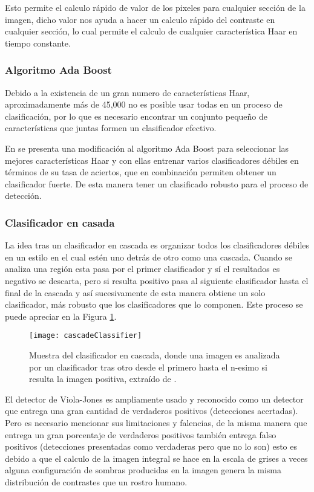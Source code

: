 Esto permite el calculo rápido de valor de los pixeles para cualquier sección de la imagen, dicho valor nos ayuda a hacer un calculo rápido del contraste en cualquier sección, lo cual permite el calculo de cualquier característica Haar en tiempo constante.
\subsubsection{Algoritmo Ada Boost}
Debido a la existencia de un gran numero de características Haar, aproximadamente más de 45,000 no es posible usar todas en un proceso de clasificación, por lo que es necesario encontrar un conjunto pequeño de características que juntas formen un clasificador efectivo.

En \cite{viola2001rapid} se presenta una modificación al algoritmo Ada Boost para seleccionar las mejores características Haar y con ellas entrenar varios clasificadores débiles en términos de su tasa de aciertos, que en combinación permiten obtener un clasificador fuerte. De esta manera tener un clasificado robusto para el proceso de detección.
\subsubsection{Clasificador en casada}
La idea tras un clasificador en cascada es organizar todos los clasificadores débiles en un estilo en el cual estén uno detrás de otro como una cascada. Cuando se analiza una región esta pasa por el primer clasificador y sí el resultados es negativo se descarta, pero si resulta positivo pasa al siguiente clasificador hasta el final de la cascada y así sucesivamente de esta manera obtiene un solo clasificador, más robusto que los clasificadores que lo componen. Este proceso se puede apreciar en la Figura \ref{im:cascade}.

\begin{figure}[h]
\center
\texttt{[image: cascadeClassifier]}
\caption{Muestra del clasificador en cascada, donde una imagen es analizada por un clasificador tras otro desde el primero hasta el n-esimo si resulta la imagen positiva, extraído de \cite{viola2001rapid}.}
\label{im:cascade}
\end{figure}

El detector de Viola-Jones es ampliamente usado y reconocido como un detector que entrega una gran cantidad de verdaderos positivos (detecciones acertadas). Pero es necesario mencionar sus limitaciones y falencias, de la misma manera que entrega un gran porcentaje de verdaderos positivos también entrega falso  positivos (detecciones presentadas como verdaderas pero que no lo son) esto es debido a que el calculo de la imagen integral se hace en la escala de grises a veces alguna configuración de sombras producidas en la imagen genera la misma distribución de contrastes que un rostro humano.

